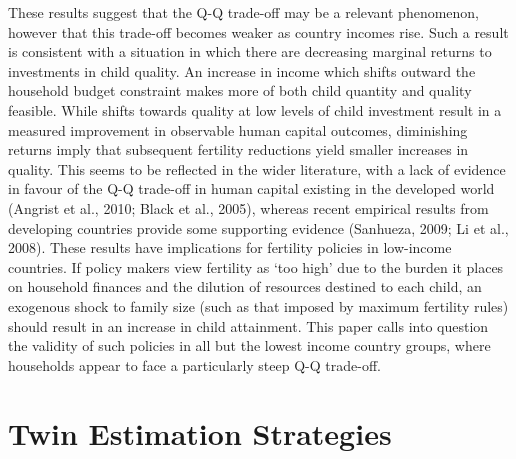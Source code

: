 \documentclass{article}[11pt,subeqn]
\begin{document}
\begin{spacing}{1.5}
These results suggest that the Q-Q trade-off may be a relevant phenomenon, however that this trade-off becomes weaker as country incomes rise.  Such a result is consistent 
with a situation in which there are decreasing marginal returns to investments in child quality.  An increase in income which shifts outward the household budget constraint makes 
more of both child quantity and quality feasible. While shifts towards quality at low levels of child investment result in a measured improvement in observable human capital 
outcomes, diminishing returns imply that subsequent fertility reductions yield smaller increases in quality.  This seems to be reflected in the wider literature, with a lack of evidence 
in favour of the Q-Q trade-off in human capital existing in the developed world (Angrist et al., 2010; Black et al., 2005), whereas recent empirical results from developing countries 
provide some supporting evidence (Sanhueza, 2009; Li et al., 2008).  These results have implications for fertility policies in low-income countries.  If policy makers view fertility 
as `too high' due to the burden it places on household finances and the dilution of resources destined to each child, an exogenous shock to family size (such as that imposed 
by maximum fertility rules) should result in an increase in child attainment.  This paper calls into question the validity of such policies in all but the lowest income country groups,
where households appear to face a particularly steep Q-Q trade-off.

\newpage


\newpage
\appendix
\section{Twin Estimation Strategies}
\label{scn:litrev}

\vspace{19.8cm}	


\end{spacing}
\end{document}
